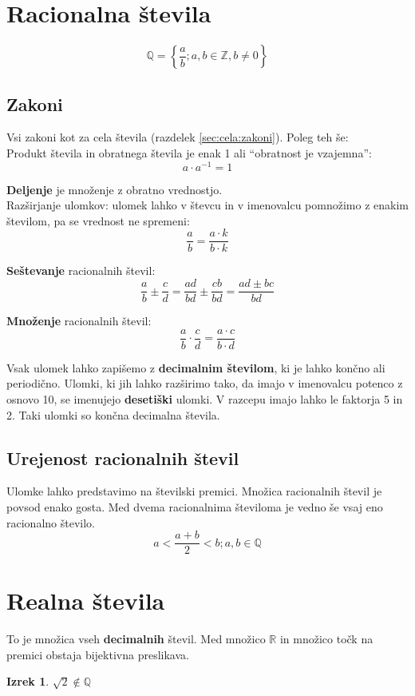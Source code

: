 \documentclass[a4paper,oneside,12pt,fleqn]{article}
\newtheorem{izrek}{Izrek} %
\def\R{\ensuremath{\mathbb R}}
\def\Z{\ensuremath{\mathbb Z}}
\def\Q{\ensuremath{\mathbb Q}}
\newcommand\krat\cdot
\numberwithin{equation}{section}
\begin{document}
\section{Racionalna števila}
\label{sec:rac}
\[ \Q = \left\{\frac{a}{b}; a,b \in \Z, b \neq 0 \right\} \]

\subsection{Zakoni}
Vsi zakoni kot za cela števila (razdelek \ref{sec:cela:zakoni}). Poleg teh še: \\
Produkt števila in obratnega števila je enak 1 ali ``obratnost je vzajemna'': 
\[ a \krat a^{-1} = 1 \]

\textbf{Deljenje} je množenje z obratno vrednostjo. \\
Razširjanje ulomkov: ulomek lahko v števcu in v imenovalcu pomnožimo z enakim številom, pa
se vrednost ne spremeni:
\[ \frac{a}{b} = \frac{a \krat k}{b \krat k} \]

\textbf{Seštevanje} racionalnih števil: 
\[ \frac{a}{b} \pm \frac{c}{d} = \frac{ad}{bd} \pm \frac{cb}{bd} = \frac{ad \pm bc}{bd} \]

\textbf{Množenje} racionalnih števil:
\[ \frac{a}{b} \krat \frac{c}{d} = \frac{a \krat c}{b \krat d} \]

Vsak ulomek lahko zapišemo z \textbf{decimalnim številom}, ki je lahko končno ali periodično.
Ulomki, ki jih lahko razširimo tako, da imajo v imenovalcu potenco z osnovo 10, se
imenujejo \textbf{desetiški} ulomki. V razcepu imajo lahko le faktorja 5 in 2. Taki ulomki so končna 
decimalna števila.

\subsection{Urejenost racionalnih števil}
Ulomke lahko predstavimo na številski premici. Množica racionalnih števil je povsod enako
gosta. Med dvema racionalnima številoma je vedno še vsaj eno racionalno število.
\[ a < \frac{a+b}{2} < b; a, b \in \Q \] 

\section{Realna števila}
To je množica vseh \textbf{decimalnih} števil. Med množico \R{} in množico točk na premici
obstaja bijektivna preslikava.
\begin{izrek}
  \label{izrek:koren2nirac}
  $\sqrt{2} \notin \Q$
\end{izrek}
\end{document}
